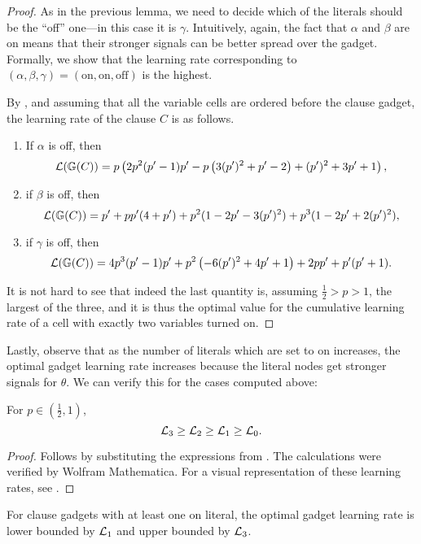 \begin{proof}
    As in the previous lemma, we need to decide which of the literals should be the ``off'' one---in this case it is $ \gamma $.
    Intuitively, again, the fact that $ \alpha $ and $ \beta $ are on means that their stronger signals can be better spread over the gadget.
    Formally, we show that the learning rate corresponding to $ \left( \alpha, \beta,\gamma \right) = \left( \text{on},\text{on},\text{off} \right) $ is the highest.

    By , and assuming that all the variable cells are ordered before the clause gadget, the learning rate of the clause $ C $ is as follows.
    \begin{enumerate}[ ]
        \item If $ \alpha $ is off, then \[
             \mathcal{L}(\mathbb{G}\!\left(C\right)) = p \left(2 p^2 (p'-1) p'-p \left(3 (p')^2+p'-2\right)+(p')^2+3 p'+1\right),
        \]
        \item if $ \beta $ is off, then \[
            \mathcal{L}(\mathbb{G}\!\left(C\right)) = p'+p p' (4+p')+p^2 (1-2 p'-3 (p')^2)+p^3 (1-2 p'+2 (p')^2),
        \]
        \item if $ \gamma $ is off, then \[
            \mathcal{L}(\mathbb{G}\!\left(C\right)) = 4 p^3 (p'-1) p'+p^2 \left(-6 (p')^2+4 p'+1\right)+2 p p'+p' (p'+1).
        \]
    \end{enumerate}
    It is not hard to see that indeed the last quantity is, assuming $ \frac 12 > p > 1 $, the largest of the three, and it is thus the optimal value for the cumulative learning rate of a cell with exactly two variables turned on.
\end{proof}

Lastly, observe that as the number of literals which are set to on increases, the optimal gadget learning rate increases because the literal nodes get stronger signals for $\theta$. We can verify this for the cases computed above:
\begin{corollary}\label{cor:bayesian_LR_comparison}
    For $p \in (\frac 1 2, 1)$, \[
    \mathcal{L}_3 \geq \mathcal{L}_2 \geq \mathcal{L}_1 \geq \mathcal{L}_0.
    \]
\end{corollary}

\begin{proof}
    Follows by substituting the expressions from .
    The calculations were verified by Wolfram Mathematica.
    For a visual representation of these learning rates, see .
\end{proof}


\begin{corollary} \label{obs:satisfied_bounds}
    For clause gadgets with at least one on literal, the optimal gadget learning rate is lower bounded by $\mathcal{L}_1$ and upper bounded by $\mathcal{L}_3$.
\end{corollary} 
